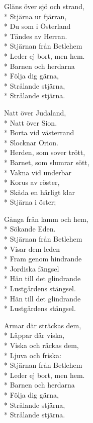 \begin{SongText}
    \begin{SongVerse}
        Gläns över sjö och strand,\\*%
        Stjärna ur fjärran,\\*%
        Du som i Österland\\*%
        Tändes av Herran.\\*%
        Stjärnan från Betlehem\\*%
        Leder ej bort, men hem.\\*%
        Barnen och herdarna\\*%
        Följa dig gärna,\\*%
        Strålande stjärna,\\*%
        Strålande stjärna.
    \end{SongVerse}
    \begin{SongVerse}
        Natt över Judaland,\\*%
        Natt över Sion.\\*%
        Borta vid västerrand\\*%
        Slocknar Orion.\\*%
        Herden, som sover trött,\\*%
        Barnet, som slumrar sött,\\*%
        Vakna vid underbar\\*%
        Korus av röster,\\*%
        Skåda en härligt klar\\*%
        Stjärna i öster;
    \end{SongVerse}
    \begin{SongVerse}
        Gånga från lamm och hem,\\*%
        Sökande Eden.\\*%
        Stjärnan från Betlehem\\*%
        Visar dem leden\\*%
        Fram genom hindrande\\*%
        Jordiska fängsel\\*%
        Hän till det glindrande\\*%
        Lustgårdens stängsel.\\*%
        Hän till det glindrande\\*%
        Lustgårdens stängsel.
    \end{SongVerse}
    \begin{SongVerse}
        Armar där sträckas dem,\\*%
        Läppar där viska,\\*%
        Viska och räckas dem,\\*%
        Ljuva och friska:\\*%
        Stjärnan från Betlehem\\*%
        Leder ej bort, men hem.\\*%
        Barnen och herdarna\\*%
        Följa dig gärna,\\*%
        Strålande stjärna,\\*%
        Strålande stjärna.
    \end{SongVerse}
\end{SongText}